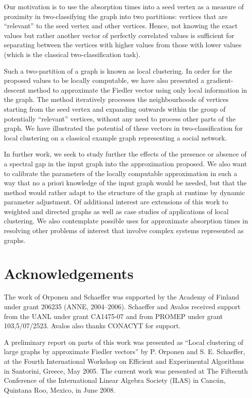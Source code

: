 \documentclass{article}
\begin{document}
Our motivation is to use the absorption times into a seed vertex 
as a measure of proximity in two-classifying the graph into two
partitions: vertices that are ``relevant'' to the seed vertex and
other vertices. Hence, not knowing the exact values but rather another
vector of perfectly correlated values is sufficient for separating
between the vertices with higher values from those with lower values
(which is the classical two-classification task).

Such a two-partition of a graph is known as local clustering. In order
for the proposed values to be locally computable, we have also presented
a gradient-descent method to approximate the Fiedler vector using only
local information in the graph. The method iteratively processes the
neighbourhoods of vertices starting from the seed vertex and expanding
outwards within the group of potentially ``relevant'' vertices,
without any need to process other parts of the graph. We have
illustrated the potential of these vectors in two-classification for local
clustering on a classical example graph representing a social network.

In further work, we seek to study further the effects of the presence
or absence of a spectral gap in the input graph into the approximation
proposed. We also want to calibrate the parameters of the locally
computable approximation in such a way that no a priori knowledge of
the input graph would be needed, but that the method would rather
adapt to the structure of the graph at runtime by dynamic parameter
adjustment. Of additional interest are extensions of this work to
weighted and directed graphs as well as case studies of applications
of local clustering. We also contemplate possible uses for approximate
absorption times in resolving other problems of interest that involve
complex systems represented as graphs.

\section*{Acknowledgements}

The work of Orponen and Schaeffer was supported by the Academy of
Finland under grant 206235 (ANNE, 2004--2006). Schaeffer and Avalos
received support from the UANL under grant CA1475-07 and from PROMEP
under grant 103,5/07/2523. Avalos also thanks CONACYT for support.

A preliminary report on parts of this work was presented as ``Local
clustering of large graphs by approximate Fiedler vectors'' by
P. Orponen and S. E. Schaeffer, at the Fourth International Workshop
on Efficient and Experimental Algorithms in Santorini, Greece, May
2005. The current work was presented at The Fifteenth Conference of the
International Linear Algebra Society (ILAS) in Canc\'{u}n, Quintana
Roo, Mexico, in June 2008.
\end{document}
